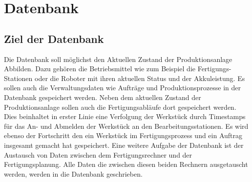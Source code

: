 \chapter{Datenbank}\label{kap:Datenbank}
\section{Ziel der Datenbank}\label{kap:ZielDerDatenbank}
Die Datenbank soll möglichst den Aktuellen Zustand der Produktionsanlage Abbilden. Dazu gehören die Betriebsmittel wie zum Beispiel die Fertigungs-Stationen oder die Roboter mit ihren aktuellen Status und der Akkuleistung. Es sollen auch die Verwaltungsdaten wie Aufträge und Produktionsprozesse in der Datenbank gespeichert werden. Neben dem aktuellen Zustand der Produktionsanlage sollen auch die Fertigungsabläufe dort gespeichert werden. Dies beinhaltet in erster Linie eine Verfolgung der Werkstück durch Timestamps für das An- und Abmelden der Werkstück an den Bearbeitungsstationen. Es wird ebenso der Fortschritt den ein Werkstück im Fertigungsprozess und ein Auftrag insgesamt gemacht hat gespeichert. Eine weitere Aufgabe der Datenbank ist der Austausch von Daten zwischen dem Fertigungsrechner und der Fertigungsplanung. Alle Daten die zwischen diesen beiden Rechnern ausgetauscht werden, werden in die Datenbank geschrieben.
 

